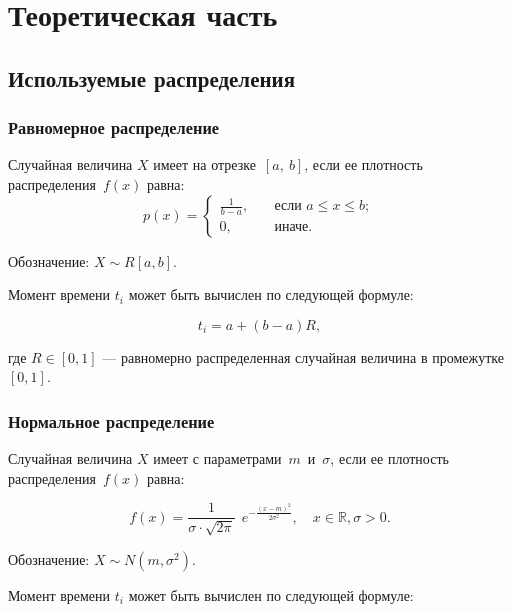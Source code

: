 \chapter{Теоретическая часть}

\section{Используемые распределения}

\subsection{Равномерное распределение}
Случайная величина $X$ имеет  на
отрезке~$[a,~b]$, если ее плотность распределения~$f(x)$ равна:
\begin{equation}
    p(x) =
    \begin{cases}
        \displaystyle\frac{1}{b - a}, & \quad \text{если } a \leq x \leq b;\\
        0,  & \quad \text{иначе}.
    \end{cases}
\end{equation}

Обозначение: $X \sim R[a, b]$.

Момент времени $t_i$ может быть вычислен по следующей формуле:

\begin{equation}
    t_i = a + (b - a) R, 
\end{equation}

где $R \in [0, 1]$ --- равномерно распределенная случайная величина в
промежутке~$[0, 1]$.

\subsection{Нормальное распределение}

Случайная величина $X$ имеет  с
параметрами~$m$~и~$\sigma$, если ее плотность распределения~$f(x)$ равна:

\begin{equation}
    f(x) = \frac{1}{\sigma \cdot \sqrt{2\pi}}~~e^{\displaystyle-\frac{(x -
    m)^2}{2\sigma^2}}, \quad x \in \mathbb{R}, \sigma > 0.
\end{equation}

Обозначение: $X \sim N(m, \sigma^2)$.

Момент времени $t_i$ может быть вычислен по следующей формуле:

